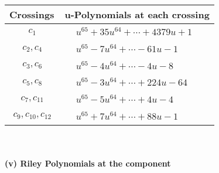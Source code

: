 \documentclass[1p]{elsarticle_modified}
\theoremstyle{definition}
\begin{document}
\begin{tabular}{m{50pt}|m{274pt}}
Crossings & \hspace{64pt}u-Polynomials at each crossing \\
\hline $$\begin{aligned}c_{1}\end{aligned}$$&$\begin{aligned}
&u^{65}+35 u^{64}+\cdots+4379 u+1
\end{aligned}$\\
\hline $$\begin{aligned}c_{2},c_{4}\end{aligned}$$&$\begin{aligned}
&u^{65}-7 u^{64}+\cdots-61 u-1
\end{aligned}$\\
\hline $$\begin{aligned}c_{3},c_{6}\end{aligned}$$&$\begin{aligned}
&u^{65}-4 u^{64}+\cdots-4 u-8
\end{aligned}$\\
\hline $$\begin{aligned}c_{5},c_{8}\end{aligned}$$&$\begin{aligned}
&u^{65}-3 u^{64}+\cdots+224 u-64
\end{aligned}$\\
\hline $$\begin{aligned}c_{7},c_{11}\end{aligned}$$&$\begin{aligned}
&u^{65}-5 u^{64}+\cdots+4 u-4
\end{aligned}$\\
\hline $$\begin{aligned}c_{9},c_{10},c_{12}\end{aligned}$$&$\begin{aligned}
&u^{65}+7 u^{64}+\cdots+88 u-1
\end{aligned}$\\
\hline
\end{tabular}\\~\\
\newpage\renewcommand{\arraystretch}{1}
\flushleft \textbf{(v) Riley Polynomials at the component}\newline \\
\end{document}
